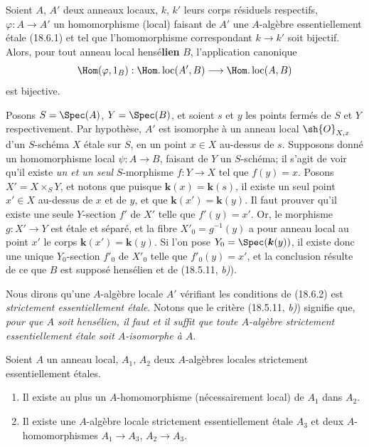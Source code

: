 \begin{lemma}[18.6.2]
Soient $A$, $A'$ deux anneaux locaux, $k$, $k'$ leurs corps résiduels respectifs, $\varphi:A\to A'$ un homomorphisme (local) faisant de $A'$ une $A$-algèbre essentiellement étale \textup{(18.6.1)} et tel que l'homomorphisme correspondant $k\to k'$ soit bijectif. Alors, pour tout anneau local \textup{hensé\textbf{lien}} $B$, l'application canonique
\[
  \Hom(\varphi,1_B):\Hom.\operatorname{loc}(A',B)\longrightarrow\Hom.\operatorname{loc}(A,B)
\]
est bijective.
\end{lemma}

Posons $S=\Spec(A)$, $Y=\Spec(B)$, et soient $s$ et $y$ les points fermés de $S$ et $Y$ respectivement. Par hypothèse, $A'$ est isomorphe à un anneau local $\sh{O}_{X,x}$ d'un $S$-schéma $X$ étale sur $S$, en un point $x\in X$ au-dessus de $s$. Supposons donné un homomorphisme local $\psi:A\to B$, faisant de $Y$ un $S$-schéma; il s'agit de voir qu'il existe \emph{un et un seul} $S$-morphisme $f:Y\to X$ tel que $f(y)=x$. Posons $X'=X\times_S Y$, et notons que puisque $\boldsymbol{k}(x)=\boldsymbol{k}(s)$, il existe un seul point $x'\in X$ au-dessus de $x$ et de $y$, et que $\boldsymbol{k}(x')=\boldsymbol{k}(y)$. Il faut prouver qu'il existe une seule $Y$-section $f'$ de $X'$ telle que $f'(y)=x'$. Or, le morphisme $g:X'\to Y$ est étale et séparé, et la fibre $X'_0=g^{-1}(y)$ a pour anneau local au point $x'$ le corps $\boldsymbol{k}(x')=\boldsymbol{k}(y)$. Si l'on pose $Y_0=\Spec(\boldsymbol{k}(y))$, il existe donc une unique $Y_0$-section $f'_0$ de $X'_0$ telle que $f'_0(y)=x'$, et la conclusion résulte de ce que $B$ est supposé hensélien et de (18.5.11, \emph{b)}).

Nous dirons qu'une $A$-algèbre locale $A'$ vérifiant les conditions de (18.6.2) est \emph{strictement essentiellement étale}. Notons que le critère (18.5.11, \emph{b)}) signifie que, \emph{pour que $A$ soit hensélien, il faut et il suffit que toute $A$-algèbre strictement essentiellement étale soit $A$-isomorphe à $A$}.

\begin{lemma}[18.6.3]
\label{IV.18.6.3}
Soient $A$ un anneau local, $A_1$, $A_2$ deux $A$-algèbres locales strictement essentiellement étales.
\begin{enumerate}
  \item[\textup{(i)}] Il existe au plus un $A$-homomorphisme (nécessairement local) de $A_1$ dans $A_2$.
  \item[\textup{(ii)}] Il existe une $A$-algèbre locale strictement essentiellement étale $A_3$ et deux $A$-homomorphismes $A_1\to A_3$, $A_2\to A_3$.
\end{enumerate}
\end{lemma}

